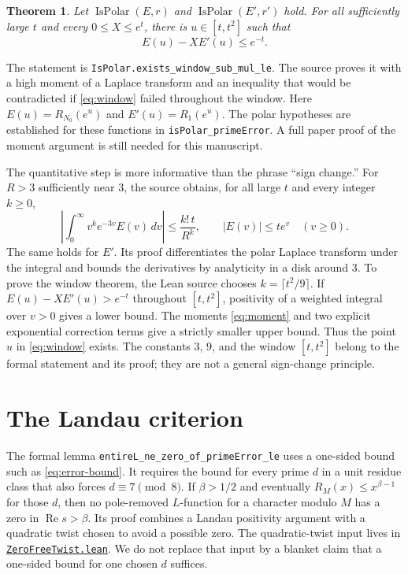 \documentclass[11pt,oneside,openany]{amsbook}
\newtheorem{theorem}{Theorem}[section]
\theoremstyle{remark}
\numberwithin{equation}{section}
\newcommand{\re}{\operatorname{Re}}
\newcommand{\ghroot}{https://github.com/lsernau/grh-lean/blob/}
\newcommand{\ghrev}{72fead102f663d5c7a407964a13dc0cf9d977207}
\newcommand{\leanfile}[2]{%
  \href{\ghroot\ghrev/grh-compact/src/#1}{\nolinkurl{#2}}}
\begin{document}
\begin{theorem}
\label{thm:window}
Let $\operatorname{IsPolar}(E,r)$ and
$\operatorname{IsPolar}(E',r')$ hold. For all sufficiently
large $t$ and every
$0\le X\le e^t$, there is $u\in[t,t^2]$ such that
\begin{equation}
\label{eq:window}
E(u)-XE'(u)\le e^{-t}.
\end{equation}
\end{theorem}
The statement is
\texttt{IsPolar.exists\_window\_sub\_mul\_le}. The source
proves it with a high moment of a Laplace transform and an
inequality that would be contradicted if \eqref{eq:window} failed
throughout the window. Here $E(u)=R_{N_0}(e^u)$ and
$E'(u)=R_1(e^u)$. The polar hypotheses are established for these
functions in \texttt{isPolar\_primeError}. A full paper proof of
the moment argument is still needed for this manuscript.

The quantitative step is more informative than the phrase
``sign change.'' For $R>3$ sufficiently near $3$, the source
obtains, for all large $t$ and every integer $k\ge0$,
\begin{equation}
\label{eq:moment}
\left|\int_0^\infty v^k e^{-3v}E(v)\,dv\right|
   \le\frac{k!\,t}{R^k},
\qquad |E(v)|\le t e^v\quad(v\ge0).
\end{equation}
The same holds for $E'$. Its proof differentiates the polar
Laplace transform under the integral and bounds the derivatives
by analyticity in a disk around $3$. To prove the window theorem,
the Lean source chooses $k=\lceil t^2/9\rceil$. If
$E(u)-XE'(u)>e^{-t}$ throughout $[t,t^2]$, positivity of a
weighted integral over $v>0$ gives a lower bound. The moments
\eqref{eq:moment} and two explicit exponential correction
terms give a strictly smaller upper bound. Thus the point
$u$ in \eqref{eq:window} exists. The constants $3$, $9$,
and the window $[t,t^2]$ belong to the formal statement and
its proof; they are not a general sign-change principle.

\section{The Landau criterion}
\label{sec:landau}
The formal lemma
\texttt{entireL\_ne\_zero\_of\_primeError\_le}
uses a one-sided bound such as \eqref{eq:error-bound}. It requires
the bound for every prime $d$ in a unit residue class that also
forces $d\equiv7\pmod8$. If $\beta>1/2$ and eventually
$R_M(x)\le x^{\beta-1}$ for those $d$, then no pole-removed
$L$-function for a character modulo $M$ has a zero in
$\re s>\beta$. Its proof combines a Landau positivity argument
with a quadratic twist chosen to avoid a possible zero. The
quadratic-twist input lives in
\leanfile{Lib/Analytic/QuadraticTwist/ZeroFreeTwist.lean}%
{ZeroFreeTwist.lean}. We do not replace that input by a blanket
claim that a one-sided bound for one chosen $d$ suffices.
\end{document}

